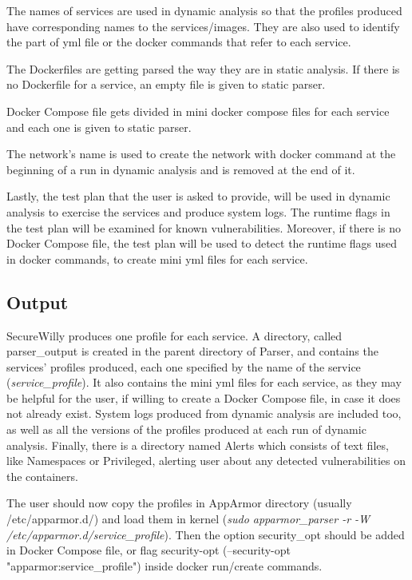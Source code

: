 The names of services are used in dynamic analysis so that the profiles produced have corresponding names to the services/images. They are also used to identify the part of yml file or the docker commands that refer to each service. 

The Dockerfiles are getting parsed the way they are in static analysis. If there is no Dockerfile for a service, an empty file is given to static parser.

Docker Compose file gets divided in mini docker compose files for each service and each one is given to static parser.

The network's name is used to create the network with docker command at the beginning of a run in dynamic analysis and is removed at the end of it.

Lastly, the test plan that the user is asked to provide, will be used in dynamic analysis to exercise the services and produce system logs. The runtime flags in the test plan will be examined for known vulnerabilities. Moreover, if there is no Docker Compose file, the test plan will be used to detect the runtime flags used in docker commands, to create mini yml files for each service.

\subsection{Output}
SecureWilly produces one profile for each service. A directory, called parser\_output is created in the parent directory of Parser, and contains the services' profiles produced, each one specified by the name of the service (\textit{service\_profile}). It also contains the mini yml files for each service, as they may be helpful for the user, if willing to create a Docker Compose file, in case it does not already exist. System logs produced from dynamic analysis are included too, as well as all the versions of the profiles produced at each run of dynamic analysis. Finally, there is a directory named Alerts which consists of text files, like Namespaces or Privileged, alerting user about any detected vulnerabilities on the containers.

The user should now copy the profiles in AppArmor directory (usually /etc/apparmor.d/) and load them in kernel (\textit{sudo apparmor\_parser -r -W /etc/apparmor.d/service\_profile}). Then the option security\_opt should be added in Docker Compose file, or flag security-opt (--security-opt "apparmor:service\_profile") inside docker run/create commands.

